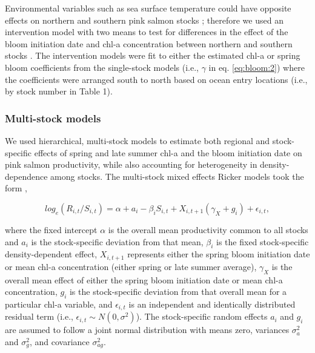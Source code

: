 Environmental variables such as sea surface temperature could have opposite
effects on northern and southern pink salmon stocks \citep{Mueter2002a,
Su2004a}; therefore we used an intervention model with two means
\citep{Chatfield2004, Mueter2002a} to test for differences in the effect of the
bloom initiation date and chl-a concentration between northern and southern
stocks \citep{Chatfield2004, Mueter2002a}. The intervention models were fit to
either the estimated chl-a or spring bloom coefficients from the single-stock
models (i.e., \(\gamma\) in eq. \ref{eq:bloom:2}) where the coefficients were
arranged south to north based on ocean entry locations (i.e., by stock number in
Table 1).


\subsubsection{Multi-stock models}

We used hierarchical, multi-stock models to estimate both regional and
stock-specific effects of spring and late summer chl-a and the bloom initiation
date on pink salmon productivity, while also accounting for heterogeneity in
density-dependence among stocks. The multi-stock mixed effects Ricker models
took the form \citep{Myers1999a, Mueter2002a},

\begin{equation}
log_e(R_{i,t}/S_{i,t}) = \alpha + a_i - \beta_iS_{i,t} + 
X_{i,t+1} (\gamma_{X} + g_{i}) + \epsilon_{i,t}, \label{eq:bloom:3}
\end{equation}

\noindent
where the fixed intercept \(\alpha\) is the overall mean productivity common to
all stocks and \(a_i\) is the stock-specific deviation from that mean,
\(\beta_i\) is the fixed stock-specific density-dependent effect, \(X_{i,t+1}\)
represents either the spring bloom initiation date or mean chl-a concentration
(either spring or late summer average), \(\gamma_X\) is the overall mean effect
of either the spring bloom initiation date or mean chl-a concentration, \(g_i\)
is the stock-specific deviation from that overall mean for a particular chl-a
variable, and \(\epsilon_{i,t}\) is an independent and identically distributed
residual term (i.e., \(\epsilon_{i,t} \sim N(0,\sigma^2)\)).  The stock-specific
random effects \(a_i\) and \(g_i\) are assumed to follow a joint normal
distribution with means zero, variances \(\sigma^2_a\) and \(\sigma^2_g\), and
covariance \(\sigma^2_{ag}\).

